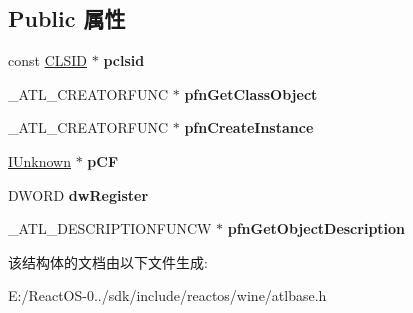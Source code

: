 \subsection*{Public 属性}
\begin{DoxyCompactItemize}
\item 
\mbox{\label{struct___a_t_l___o_b_j_m_a_p___e_n_t_r_y_w___v1___t_a_g_a9b3430f55e2313cb31b4a462de2cdd54}} 
const \hyperlink{struct___i_i_d}{C\+L\+S\+ID} $\ast$ {\bfseries pclsid}
\item 
\mbox{\label{struct___a_t_l___o_b_j_m_a_p___e_n_t_r_y_w___v1___t_a_g_ad9d38ff0ec59fd86bb1de49244af08c4}} 
\+\_\+\+A\+T\+L\+\_\+\+C\+R\+E\+A\+T\+O\+R\+F\+U\+NC $\ast$ {\bfseries pfn\+Get\+Class\+Object}
\item 
\mbox{\label{struct___a_t_l___o_b_j_m_a_p___e_n_t_r_y_w___v1___t_a_g_adc0d74e9afafd9b330982669c2730215}} 
\+\_\+\+A\+T\+L\+\_\+\+C\+R\+E\+A\+T\+O\+R\+F\+U\+NC $\ast$ {\bfseries pfn\+Create\+Instance}
\item 
\mbox{\label{struct___a_t_l___o_b_j_m_a_p___e_n_t_r_y_w___v1___t_a_g_aa8e633ea3c27a60e04f1d6f99f9afc0e}} 
\hyperlink{interface_i_unknown}{I\+Unknown} $\ast$ {\bfseries p\+CF}
\item 
\mbox{\label{struct___a_t_l___o_b_j_m_a_p___e_n_t_r_y_w___v1___t_a_g_a91dd61e81c44d889a3256d088aa53022}} 
D\+W\+O\+RD {\bfseries dw\+Register}
\item 
\mbox{\label{struct___a_t_l___o_b_j_m_a_p___e_n_t_r_y_w___v1___t_a_g_a0cb506ad25be1cdf8ca45dc6f46be16a}} 
\+\_\+\+A\+T\+L\+\_\+\+D\+E\+S\+C\+R\+I\+P\+T\+I\+O\+N\+F\+U\+N\+CW $\ast$ {\bfseries pfn\+Get\+Object\+Description}
\end{DoxyCompactItemize}


该结构体的文档由以下文件生成\+:\begin{DoxyCompactItemize}
\item 
E\+:/\+React\+O\+S-\/0../sdk/include/reactos/wine/atlbase.\+h\end{DoxyCompactItemize}
